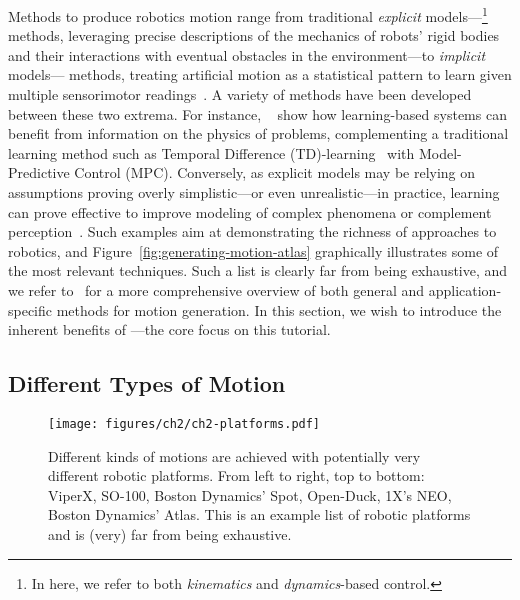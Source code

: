 Methods to produce robotics motion range from traditional \emph{explicit} models---\footnote{In here, we refer to both \emph{kinematics} and \emph{dynamics}-based control.} methods, leveraging precise descriptions of the mechanics of robots' rigid bodies and their interactions with eventual obstacles in the environment---to \emph{implicit} models--- methods, treating artificial motion as a statistical pattern to learn given multiple sensorimotor readings~\citep{agrawalComputationalSensorimotorLearning,bekrisStateRobotMotion2024}.
A variety of methods have been developed between these two extrema.
For instance, ~\citet{hansenTemporalDifferenceLearning2022} show how learning-based systems can benefit from information on the physics of problems, complementing a traditional learning method such as Temporal Difference (TD)-learning~\citet{suttonReinforcementLearningIntroduction2018} with Model-Predictive Control (MPC).
Conversely, as explicit models may be relying on assumptions proving overly simplistic---or even unrealistic---in practice, learning can prove effective to improve modeling of complex phenomena or complement perception~\citep{mccormacSemanticFusionDense3D2016}.
Such examples aim at demonstrating the richness of approaches to robotics, and Figure~\ref{fig:generating-motion-atlas} graphically illustrates some of the most relevant techniques.
Such a list is clearly far from being exhaustive, and we refer to~\citet{bekrisStateRobotMotion2024} for a more comprehensive overview of both general and application-specific methods for motion generation.
In this section, we wish to introduce the inherent benefits of ---the core focus on this tutorial.

\subsection{Different Types of Motion}

\begin{figure}
    \centering
    \texttt{[image: figures/ch2/ch2-platforms.pdf]}
    \caption{Different kinds of motions are achieved with potentially very different robotic platforms. From left to right, top to bottom: ViperX, SO-100, Boston Dynamics' Spot, Open-Duck, 1X's NEO, Boston Dynamics' Atlas. This is an example list of robotic platforms and is (very) far from being exhaustive.}
    \label{fig:robotics-platforms-atlas}
\end{figure}

